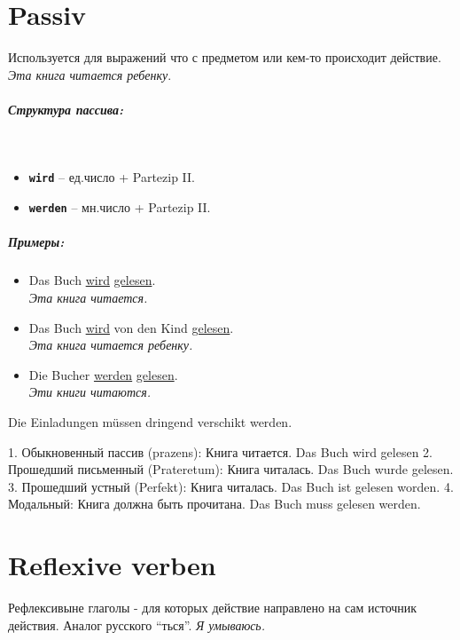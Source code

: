 \documentclass[12pt,a4paper]{report}
\newcommand{\term}[1]{\texttt{\textbf{#1}}}
\newcommand{\satzew}[1]{\underline{#1}}
\newcommand{\ubersatze}[1]{\textit{#1}}
\begin{document}
\chapter{Passiv}

Используется для выражений что с предметом или кем-то происходит действие. \ubersatze{Эта книга читается ребенку}.

\paragraph{Структура пассива:} ~\\
\begin{itemize}
\item \term{wird} -- ед.число + Partezip II.
\item \term{werden} -- мн.число + Partezip II.
\end{itemize}

\paragraph{Примеры:}
\begin{itemize}
\item Das Buch \satzew{wird} \satzew{gelesen}.
~\\ \ubersatze{Эта книга читается.}
\item Das Buch \satzew{wird} von den Kind \satzew{gelesen}.
~\\ \ubersatze{Эта книга читается ребенку.}
\item Die Bucher \satzew{werden} \satzew{gelesen}.
~\\ \ubersatze{Эти книги читаются.}
\end{itemize}

Die Einladungen müssen dringend verschikt werden.

1. Обыкновенный пассив (prazens): Книга читается. Das Buch wird gelesen
2. Прошедший письменный (Prateretum): Книга читалась. Das Buch wurde gelesen.
3. Прошедший устный (Perfekt): Книга читалась. Das Buch ist gelesen worden.
4. Модальный: Книга должна быть прочитана. Das Buch muss gelesen werden.

\chapter{Reflexive verben}
Рефлексивыне глаголы - для которых действие направлено на сам источник действия. Аналог русского ``ться''. \ubersatze{Я умываюсь.}
\end{document}
